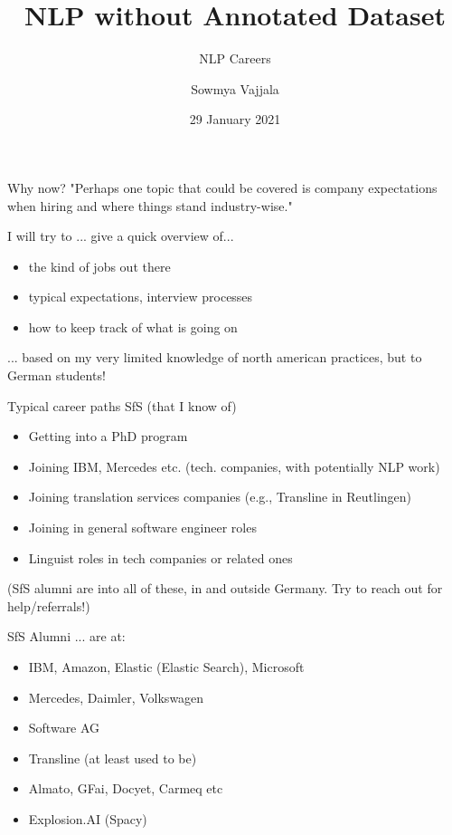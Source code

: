 \documentclass{beamer}
\author[Sowmya Vajjala]{Sowmya Vajjala}
\title[SfSNLP]{NLP without Annotated Dataset}
\subtitle{NLP Careers}
\date{29 January 2021}
\institute{Seminar f\"ur Sprachwissenschaft, University of T\"ubingen, Germany}
\begin{document}
\begin{frame}\titlepage
\end{frame}

\begin{frame}{Why now?}
    "Perhaps one topic that could be covered is company expectations when hiring and where things stand industry-wise."
\end{frame}

\begin{frame}{I will try to ... }
give a quick overview of... 
    \begin{itemize}
        \item the kind of jobs out there
        \item typical expectations, interview processes
        \item how to keep track of what is going on
    \end{itemize}
    ... based on my very limited knowledge of north american practices, but to German students!
\end{frame}

\begin{frame}{Typical career paths SfS}
(that I know of)
    \begin{itemize}
        \item Getting into a PhD program 
        \item Joining IBM, Mercedes etc. (tech. companies, with potentially NLP work)
        \item Joining translation services companies (e.g., Transline in Reutlingen) 
        \item Joining in general software engineer roles
        \item Linguist roles in tech companies or related ones
    \end{itemize}
    (SfS alumni are into all of these, in and outside Germany. Try to reach out for help/referrals!)
\end{frame}

\begin{frame}{SfS Alumni}
... are at:
    \begin{itemize}
        \item IBM, Amazon, Elastic (Elastic Search), Microsoft
        \item Mercedes, Daimler, Volkswagen
        \item Software AG
        \item Transline (at least used to be)
        \item Almato, GFai, Docyet, Carmeq etc
        \item Explosion.AI (Spacy)
    \end{itemize}
\end{frame}
\end{document}
